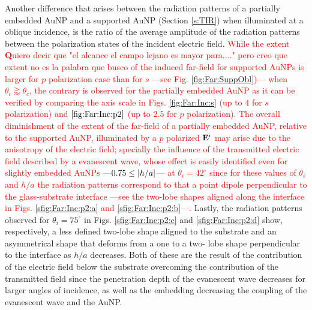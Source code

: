 Another difference that arises between  the radiation patterns of a partially embedded AuNP and a supported AuNP (Section \ref{s:TIR}) when illuminated at a oblique incidence, is the ratio of the  average amplitude of the radiation patterns between the  polarization states of the incident electric field. \textcolor{red}{While the extent \textcolor{red}{\textbf Quiero decir que "el alcance el campo lejano es mayor para...." pero creo que extent no es la palabra que busco} of the induced far-field for supported AuNPs is larger for  $p$ polarization case than for $s$ ---see Fig. \ref{fig:Far:SuppObl})--- when $\theta_i \gtrapprox  \theta_c$, the contrary is observed for the partially embedded AuNP as it can be verified by comparing the axis scale in Figs. \ref{fig:Far:Inc:s} (up to $4$ for $s$ polarization) and $\ref{fig:Far:Inc:p2}$ (up to $2.5$ for $p$ polarization). The overall diminishment of the extent of the far-field of a partially embedded AuNP, relative to the supported AuNP, illuminated by a $p$ polarized $\vb{E}^\text{i}$ may arise due to the anisotropy of the electric field; specially the influence of the transmitted electric field described by a evanescent wave, whose effect is easily identified even for slightly embedded AuNPs ---$0.75\leq\abs{h/a}$--- at $\theta_i=42^\circ$ since for these values of $\theta_i$ and $h/a$ the radiation patterns correspond to that a point dipole perpendicular to the glass-substrate interface ---see the two-lobe shapes aligned along the interface in Figs. \ref{sfig:Far:Inc:p2:a} and \ref{sfig:Far:Inc:p2:b}---.} Lastly, the radiation patterns observed for $\theta_i = 75^\circ$ in Figs. \ref{sfig:Far:Inc:p2:c} and \ref{sfig:Far:Inc:p2:d} show, respectively, a less defined two-lobe shape aligned to the substrate and an asymmetrical shape that deforms from  a one to a two- lobe shape perpendicular to the interface as $h/a$ decreases. Both of these  are the result of the contribution of the electric field below the substrate overcoming the contribution of the transmitted field since
the penetration depth of the evanescent wave decreases for larger angles of incidence, as well as the embedding  decreasing the coupling of the evanescent wave and the AuNP.

